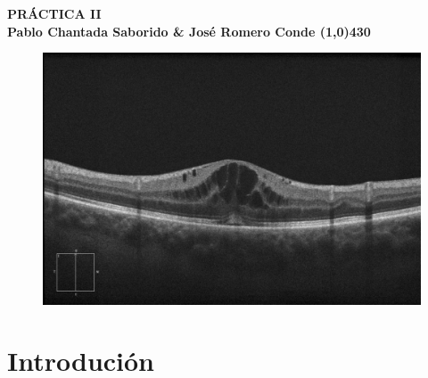 \documentclass{article}
\begin{document}
	\begin{center}
		\LARGE\bfseries PRÁCTICA II\\
		\small Pablo Chantada Saborido \& José Romero Conde
		\line(1,0){430}
	\end{center}
	
\vspace*{300pt}
	
\begin{figure}[H]
	\centering
	\includegraphics[width=0.7\linewidth]{figuras/portada.jpg}
	\label{fig:portada}
\end{figure}
	
\thispagestyle{empty}
	
\newpage

\tableofcontents

\newpage
	
	
\section{Introdución}
\end{document}

